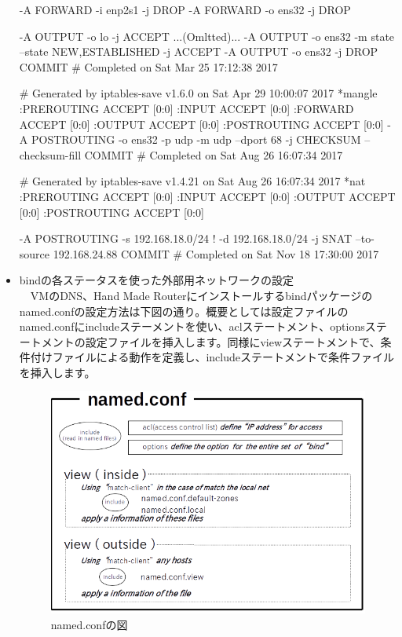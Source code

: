 \documentclass[mingoth,a4paper]{jsarticle}
\begin{document}
\begin{itemize}
\begin{commandline}
-A FORWARD -i enp2s1 -j DROP
-A FORWARD -o ens32 -j DROP

-A OUTPUT -o lo -j ACCEPT
...(Omltted)...
-A OUTPUT -o ens32 -m state --state NEW,ESTABLISHED -j ACCEPT
-A OUTPUT -o ens32 -j DROP
COMMIT
# Completed on Sat Mar 25 17:12:38 2017

# Generated by iptables-save v1.6.0 on Sat Apr 29 10:00:07 2017
*mangle
:PREROUTING ACCEPT [0:0]
:INPUT ACCEPT [0:0]
:FORWARD ACCEPT [0:0]
:OUTPUT ACCEPT [0:0]
:POSTROUTING ACCEPT [0:0]
-A POSTROUTING -o ens32 -p udp -m udp --dport 68 -j CHECKSUM --checksum-fill
COMMIT
# Completed on Sat Aug 26 16:07:34 2017

# Generated by iptables-save v1.4.21 on Sat Aug 26 16:07:34 2017
*nat
:PREROUTING ACCEPT [0:0]
:INPUT ACCEPT [0:0]
:OUTPUT ACCEPT [0:0]
:POSTROUTING ACCEPT [0:0]

-A POSTROUTING -s 192.168.18.0/24 ! -d 192.168.18.0/24 -j SNAT --to-source 192.168.24.88
COMMIT
# Completed on Sat Nov 18 17:30:00 2017  
\end{commandline}

\clearpage

\item bindの各ステータスを使った外部用ネットワークの設定\\
　VMのDNS、Hand Made Routerにインストールするbindパッケージのnamed.confの設定方法は下図の通り。概要としては設定ファイルのnamed.confにincludeステーメントを使い、aclステートメント、optionsステートメントの設定ファイルを挿入します。同様にviewステートメントで、条件付けファイルによる動作を定義し、includeステートメントで条件ファイルを挿入します。
\begin{figure}[!h]
\centering
\includegraphics{image201803-kansai/named_conf.png}
\caption{named.confの図}
\end{figure}


\end{itemize}
\end{document}
